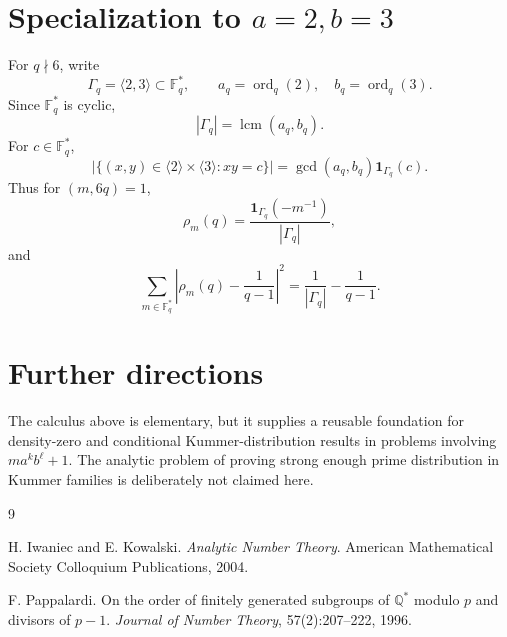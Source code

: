 \documentclass[11pt]{article}
\newcommand{\F}{\mathbb F}
\newcommand{\1}{\mathbf 1}
\newcommand{\ord}{\operatorname{ord}}
\newcommand{\lcm}{\operatorname{lcm}}
\begin{document}
\section{Specialization to \(a=2,b=3\)}

For \(q\nmid6\), write
\[
\Gamma_q=\langle2,3\rangle\subset\F_q^*,
\qquad
a_q=\ord_q(2),\quad b_q=\ord_q(3).
\]
Since \(\F_q^*\) is cyclic,
\[
|\Gamma_q|=\lcm(a_q,b_q).
\]
For \(c\in\F_q^*\),
\[
|\{(x,y)\in\langle2\rangle\times\langle3\rangle:xy=c\}|
=
\gcd(a_q,b_q)\1_{\Gamma_q}(c).
\]
Thus for \((m,6q)=1\),
\[
\rho_m(q)=\frac{\1_{\Gamma_q}(-m^{-1})}{|\Gamma_q|},
\]
and
\[
\sum_{m\in\F_q^*}\left|
\rho_m(q)-\frac1{q-1}
\right|^2
=
\frac1{|\Gamma_q|}-\frac1{q-1}.
\]

\section{Further directions}

The calculus above is elementary, but it supplies a reusable foundation for density-zero and conditional Kummer-distribution results in problems involving \(m a^k b^\ell+1\).  The analytic problem of proving strong enough prime distribution in Kummer families is deliberately not claimed here.


\begin{thebibliography}{9}

H. Iwaniec and E. Kowalski.
\newblock \emph{Analytic Number Theory}.
\newblock American Mathematical Society Colloquium Publications, 2004.

F. Pappalardi.
\newblock On the order of finitely generated subgroups of \(\mathbb Q^*\) modulo \(p\) and divisors of \(p-1\).
\newblock \emph{Journal of Number Theory}, 57(2):207--222, 1996.

\end{thebibliography}
\end{document}
